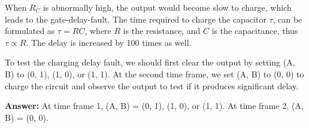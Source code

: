 When $R_C$ is abnormally high, the output would become slow to charge, which leads to the gate-delay-fault. The time required to charge the capacitor $\tau$, can be formulated as $\tau = RC$, where $R$ is the resistance, and $C$ is the capacitance, thus $\tau \propto R$. The delay is increased by 100 times as well.

To test the charging delay fault, we should first clear the output by setting (A, B) to (0, 1), (1, 0), or (1, 1). At the second time frame, we set (A, B) to (0, 0) to charge the circuit and observe the output to test if it produces significant delay.

\textbf{Answer:} At time frame 1, (A, B) = (0, 1), (1, 0), or (1, 1). At time frame 2, (A, B) = (0, 0).
